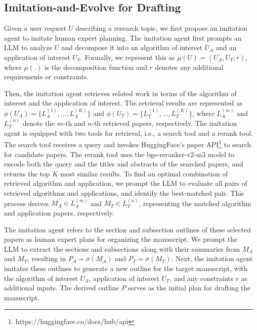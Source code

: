 \documentclass[manuscript,review,anonymous]{acmart}
\begin{document}
\subsection{Imitation-and-Evolve for Drafting}

Given a user request $U$ describing a research topic, we first propose an imitation agent to imitate human expert planning. The imitation agent first prompts an LLM to analyze $U$ and decompose it into an algorithm of interest $U_A$ and an application of interest $U_T$. Formally, we represent this as $\mu(U) = (U_A, U_T; r)$, where $\mu(.)$ is the decomposition function and $r$ denotes any additional requirements or constraints.

Then, the imitation agent retrieves related work in terms of the algorithm of interest and the application of interest. The retrieval results are represented as $\phi(U_A) = \{L_A^{(1)}, \ldots, L_A^{(K)}\}$ and $\phi(U_T) = \{L_T^{(1)}, \ldots, L_T^{(K)}\}$, where $L_A^{(m)}$ and $L_T^{(n)}$ denote the $m$-th and $n$-th retrieved papers, respectively. The imitation agent is equipped with two tools for retrieval, i.e., a search tool and a rerank tool. The search tool receives a query and invokes HuggingFace's paper API\footnote{https://huggingface.co/docs/hub/api} to search for candidate papers. The rerank tool uses the bge-reranker-v2-m3 \cite{chen2024bge} model to encode both the query and the titles and abstracts of the searched papers, and returns the top $K$ most similar results. To find an optimal combination of retrieved algorithm and application, we prompt the LLM to evaluate all pairs of retrieved algorithms and applications, and identify the best-matched pair. This process derives $M_A \in {L_A^{(m)}}$ and $M_T \in {L_T^{(n)}}$, representing the matched algorithm and application papers, respectively.

The imitation agent refers to the section and subsection outlines of these selected papers as human expert plans for organizing the manuscript. We prompt the LLM to extract the sections and subsections along with their summaries from $M_A$ and $M_T$, resulting in $P_A = \sigma(M_A)$ and $P_T = \sigma(M_T)$. Next, the imitation agent imitates these outlines to generate a new outline for the target manuscript, with the algorithm of interest $U_A$, application of interest $U_T$, and any constraints $r$ as additional inputs. The derived outline $P$ serves as the initial plan for drafting the manuscript.
\end{document}
